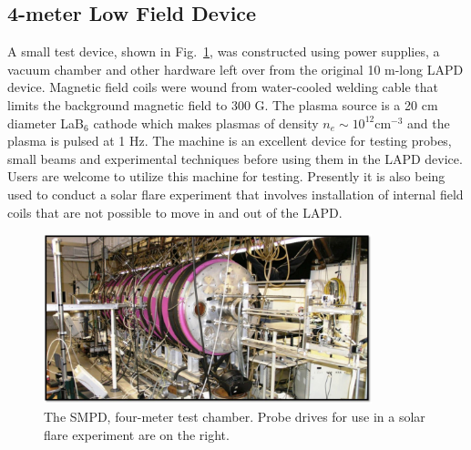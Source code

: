\documentclass[11pt]{article}
\begin{document}
\subsection{4-meter Low Field Device}
A small test device, shown in Fig.\ \ref{fig:smpd}, was constructed using power supplies, a vacuum chamber and other hardware left over from the original 10 m-long LAPD device.  Magnetic field coils were wound from water-cooled welding cable that limits the background magnetic field to 300 G.  The plasma source is a 20 cm diameter LaB$_{6}$ cathode which makes plasmas of density $n_{e}\sim 10^{12}$cm$^{-3}$  and the plasma is pulsed at 1 Hz.  The machine is an excellent device for testing probes, small beams and experimental techniques before using them in the LAPD device.  Users are welcome to utilize this machine for testing.  Presently it is also being used to conduct a solar flare experiment that involves installation of internal field coils that are not possible to move in and out of the LAPD.
\begin{figure}[htbp] %
   \centering
   \includegraphics[width=0.85\textwidth]{smpd.jpg} 
   \caption{The SMPD, four-meter test chamber.  Probe drives for use in a solar flare experiment are on the right.}
   \label{fig:smpd}
\end{figure}
\end{document}
